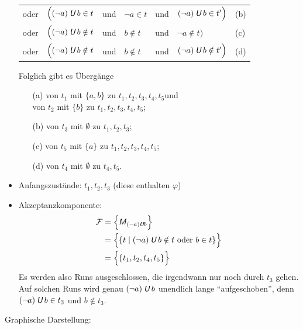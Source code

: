 \documentclass[fontsize=11pt, twoside=false, numbers=autoenddot]{scrbook}
\begin{document}
\begin{itemize}
\begin{center}
\begin{tabular}{@{}l@{~~}l@{~~}l@{~~}l@{~~}l@{~~}l@{\qquad}l@{}}
        oder & $\Big((\lnot a)\mathbin{\textit{\textsf{U}}} b\in t$    & und & $\lnot a\in t$ & und & $(\lnot a)\mathbin{\textit{\textsf{U}}} b \in t'\Big)$   & (b) \\
        oder & $\Big((\lnot a)\mathbin{\textit{\textsf{U}}} b\notin t$ & und & $b \notin t$   & und & $\lnot a \notin t\Big)$       & (c) \\
        oder & $\Big((\lnot a)\mathbin{\textit{\textsf{U}}} b\notin t$ & und & $b \notin t$   & und & $(\lnot a)\mathbin{\textit{\textsf{U}}} b\notin t'\Big)$ & (d)
      \end{tabular}
    \end{center}
    Folglich gibt es Übergänge
    \begin{itemize}
      \item[(a)]
        von $t_1$ mit $\{a,b\}$ zu $t_1,t_2,t_3,t_4,t_5$\quad und \\
        von $t_2$ mit $\{b\}$ zu $t_1,t_2,t_3,t_4,t_5$;
      \item[(b)]
        von $t_3$ mit $\emptyset$ zu $t_1,t_2,t_3$;
      \item[(c)]
        von $t_5$ mit $\{a\}$ zu $t_1,t_2,t_3,t_4,t_5$;
      \item[(d)]
        von $t_4$ mit $\emptyset$ zu $t_4,t_5$.
    \end{itemize}
  \item
    Anfangszustände: $t_1,t_2,t_3$ (diese enthalten $\varphi$)
  \item
    Akzeptanzkomponente:
    \begin{align*}
      \mathcal{F} & = \Big\{\textsf{\textit{M}}_{(\lnot a)\mathbin{\textit{\textsf{U}}} b}\Big\} \\
           & = \Big\{ \{t \mid (\lnot a)\mathbin{\textit{\textsf{U}}} b \notin t \text{~oder~} b \in t \} \Big\} \\
           & = \Big\{\{t_1,t_2,t_4,t_5\}\Big\}
    \end{align*}
    Es werden also Runs ausgeschlossen, die irgendwann nur noch durch $t_3$ gehen.
    Auf solchen Runs wird genau $(\lnot a)\mathbin{\textit{\textsf{U}}} b$ unendlich lange "`aufgeschoben"',
    denn $(\lnot a)\mathbin{\textit{\textsf{U}}} b \in t_3$ und $b \notin t_3$.
\end{itemize}
%
\enlargethispage*{20mm}
Graphische Darstellung:
%
\vspace*{-2\baselineskip}
\end{document}
